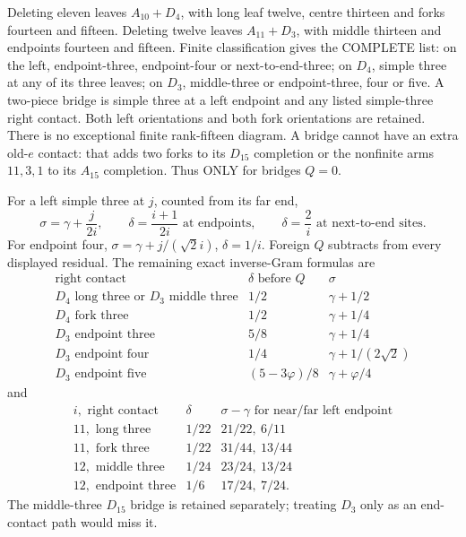 \documentclass[11pt]{article}
\begin{document}
Deleting eleven leaves \(A_{10}+D_4\), with long leaf twelve,
centre thirteen and forks fourteen and fifteen.
Deleting twelve leaves \(A_{11}+D_3\), with middle thirteen
and endpoints fourteen and fifteen.
Finite classification gives the COMPLETE list:
on the left, endpoint-three, endpoint-four or next-to-end-three;
on \(D_4\), simple three at any of its three leaves;
on \(D_3\), middle-three or endpoint-three, four or five.
A two-piece bridge is simple three at a left endpoint and
any listed simple-three right contact.
Both left orientations and both fork orientations are retained.
There is no exceptional finite rank-fifteen diagram.
A bridge cannot have an extra old-\(e\) contact:
that adds two forks to its \(D_{15}\) completion or the
nonfinite arms \(11,3,1\) to its \(A_{15}\) completion.
Thus ONLY for bridges \(Q=0\).

For a left simple three at \(j\), counted from its far end,
\[
 \sigma=\gamma+{\frac{j}{2i}},\qquad
 \delta={\frac{i+1}{2i}}\text{ at endpoints},\qquad
 \delta={\frac{2}{i}}\text{ at next-to-end sites}.
\]
For endpoint four,
\(\sigma=\gamma+j/(\sqrt2i)\), \(\delta=1/i\).
Foreign \(Q\) subtracts from every displayed residual.
The remaining exact inverse-Gram formulas are
\[
\begin{array}{c|c|c}
 \text{right contact}&\delta\text{ before }Q&\sigma\\ \hline
 D_4\text{ long three or }D_3\text{ middle three}
       &1/2&\gamma+1/2\\
 D_4\text{ fork three}&1/2&\gamma+1/4\\
 D_3\text{ endpoint three}&5/8&\gamma+1/4\\
 D_3\text{ endpoint four}&1/4&\gamma+1/(2\sqrt2)\\
 D_3\text{ endpoint five}&(5-3\varphi)/8&\gamma+\varphi/4
\end{array}
\]
and
\[
\begin{array}{c|c|c}
 i,\text{ right contact}&\delta&
       \sigma-\gamma\text{ for near/far left endpoint}\\ \hline
11,\text{ long three}&1/22&21/22,\ 6/11\\
11,\text{ fork three}&1/22&31/44,\ 13/44\\
12,\text{ middle three}&1/24&23/24,\ 13/24\\
12,\text{ endpoint three}&1/6&17/24,\ 7/24 .
\end{array}
\]
The middle-three \(D_{15}\) bridge is retained separately;
treating \(D_3\) only as an end-contact path would miss it.
\end{document}
